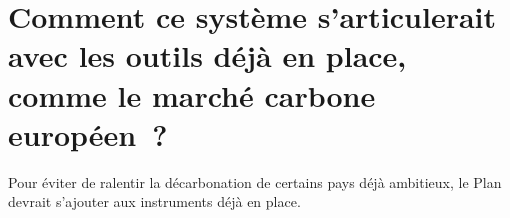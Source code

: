 \documentclass[a5paper,french,openany]{memoir}
\begin{document}




\section*{\normalsize Comment ce système s'articulerait avec les outils déjà en place, comme le marché carbone européen~?}\label{q:ets}

Pour éviter de ralentir la décarbonation de certains pays déjà ambitieux, le Plan devrait s'ajouter aux instruments déjà en place. 
\end{document}
